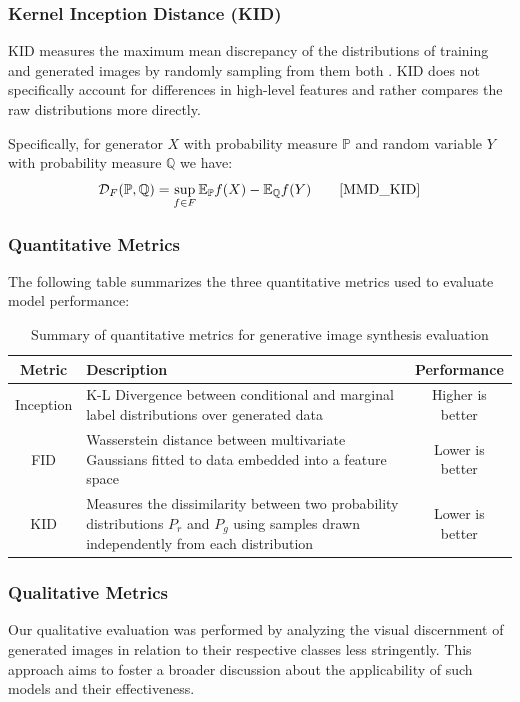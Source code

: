 \documentclass[%
 reprint,
 amsmath,amssymb,
 aps,
]{revtex4-2}
\begin{document}
\subsubsection{Kernel Inception Distance (KID)}
KID measures the maximum mean discrepancy of the distributions of training and generated images by randomly sampling from them both \cite{MMD_KID}. KID does not specifically account for differences in high-level features and rather compares the raw distributions more directly.


Specifically, for generator $X$ with probability measure $\mathbb{P}$ and random variable $Y$ with probability measure $\mathbb{Q}$ we have:
\begin{equation}
\mathcal{D}_F(\mathbb{P},\mathbb{Q}) = \sup_{f\in F}\mathbb{E}_\mathbb{P}f(X) - \mathbb{E}_\mathbb{Q}f(Y)\qquad
\cite{MMD_KID}
\end{equation}

\subsubsection{Quantitative Metrics}
The following table summarizes the three quantitative metrics used to evaluate model performance:
\begin{table}[h]
\caption{\label{tab:metrics}
Summary of quantitative metrics for generative image synthesis evaluation} 
\begin{ruledtabular}
    \begin{tabular}{cp{4cm}c}
         Metric& Description &Performance\\ \hline 
 Inception & K-L Divergence between conditional and marginal label distributions over generated data & Higher is better\\ \hline
 FID & Wasserstein distance between multivariate Gaussians fitted to data embedded into a feature space & Lower is better\\ \hline
 KID & Measures the dissimilarity between two probability distributions $P_r$ and $P_g$ using samples drawn independently from each distribution & Lower is better\\
    \end{tabular}
\end{ruledtabular}
\end{table}


\subsubsection{Qualitative Metrics}
Our qualitative evaluation was performed by analyzing the visual discernment of generated images in relation to their respective classes less stringently. This approach aims to foster a broader discussion about the applicability of such models and their effectiveness.
\end{document}

